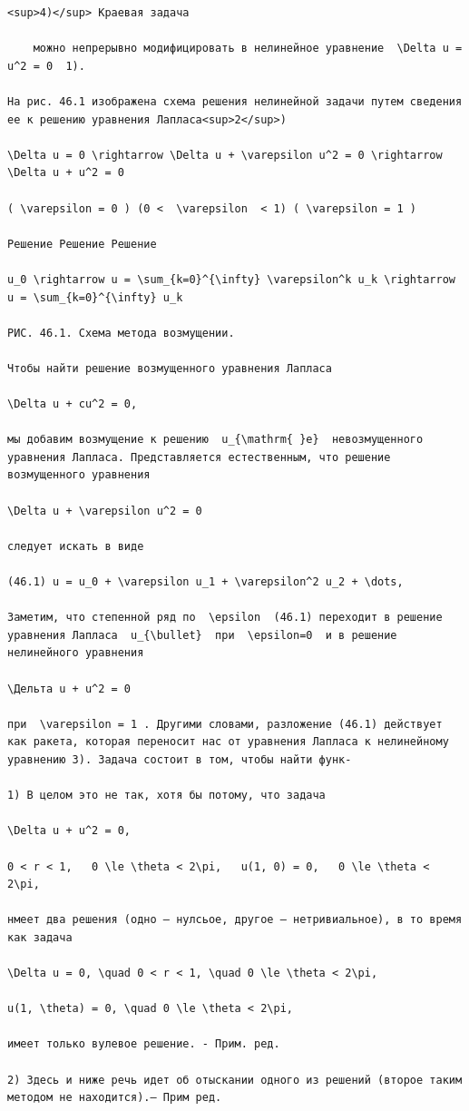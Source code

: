 \documentclass[
  ukrainian,
]{article}
\begin{document}
\begin{verbatim}
<sup>4)</sup> Краевая задача

    можно непрерывно модифицировать в нелинейное уравнение  \Delta u = u^2 = 0  1).

На рис. 46.1 изображена схема решения нелинейной задачи путем сведения ее к решению уравнения Лапласа<sup>2</sup>)

\Delta u = 0 \rightarrow \Delta u + \varepsilon u^2 = 0 \rightarrow \Delta u + u^2 = 0

( \varepsilon = 0 ) (0 <  \varepsilon  < 1) ( \varepsilon = 1 )

Решение Решение Решение

u_0 \rightarrow u = \sum_{k=0}^{\infty} \varepsilon^k u_k \rightarrow u = \sum_{k=0}^{\infty} u_k

РИС. 46.1. Схема метода возмущении.

Чтобы найти решение возмущенного уравнения Лапласа

\Delta u + cu^2 = 0,

мы добавим возмущение к решению  u_{\mathrm{ }e}  невозмущенного уравнения Лапласа. Представляется естественным, что решение возмущенного уравнения

\Delta u + \varepsilon u^2 = 0

следует искать в виде

(46.1) u = u_0 + \varepsilon u_1 + \varepsilon^2 u_2 + \dots,

Заметим, что степенной ряд по  \epsilon  (46.1) переходит в решение уравнения Лапласа  u_{\bullet}  при  \epsilon=0  и в решение нелинейного уравнения

\Дельта u + u^2 = 0

при  \varepsilon = 1 . Другими словами, разложение (46.1) действует как ракета, которая переносит нас от уравнения Лапласа к нелинейному уравнению 3). Задача состоит в том, чтобы найти функ-

1) В целом это не так, хотя бы потому, что задача

\Delta u + u^2 = 0,

0 < r < 1,   0 \le \theta < 2\pi,   u(1, 0) = 0,   0 \le \theta < 2\pi,

нмеет два решения (одно — нулсьое, другое — нетривиальное), в то время как задача

\Delta u = 0, \quad 0 < r < 1, \quad 0 \le \theta < 2\pi,

u(1, \theta) = 0, \quad 0 \le \theta < 2\pi,

имеет только вулевое решение. - Прим. ред.

2) Здесь и ниже речь идет об отыскании одного из решений (второе таким методом не находится).— Прим ред.


\end{verbatim}
\end{document}
